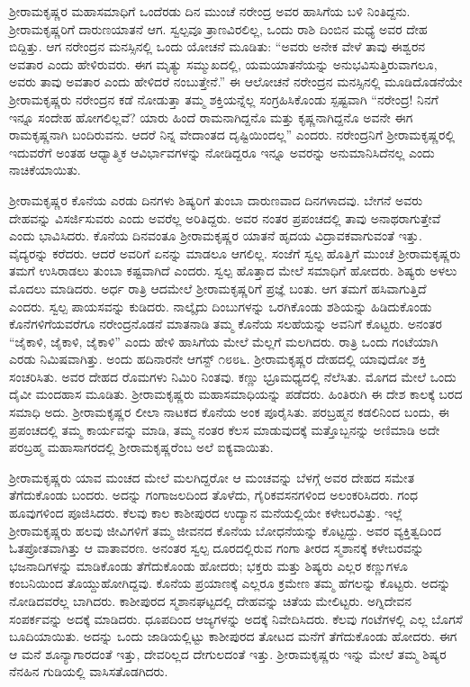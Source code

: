ಶ‍್ರೀರಾಮಕೃಷ್ಣರ ಮಹಾಸಮಾಧಿಗೆ ಒಂದೆರಡು ದಿನ ಮುಂಚೆ ನರೇಂದ್ರ ಅವರ ಹಾಸಿಗೆಯ ಬಳಿ ನಿಂತಿದ್ದನು. ಶ‍್ರೀರಾಮಕೃಷ್ಣರಿಗೆ ದಾರುಣಯಾತನೆ ಆಗ. ಸ್ವಲ್ಪವೂ ತ್ರಾಣವಿರಲಿಲ್ಲ, ಒಂದು ರಾಶಿ ದಿಂಬಿನ ಮಧ್ಯೆ ಅವರ ದೇಹ ಬಿದ್ದಿತ್ತು. ಆಗ ನರೇಂದ್ರನ ಮನಸ್ಸಿನಲ್ಲಿ ಒಂದು ಯೋಚನೆ ಮೂಡಿತು: “ಅವರು ಅನೇಕ ವೇಳೆ ತಾವು ಈಶ್ವರನ ಅವತಾರ ಎಂದು ಹೇಳಿರುವರು. ಈಗ ಮೃತ್ಯು ಸಮ್ಮುಖದಲ್ಲಿ, ಯಮಯಾತನೆಯನ್ನು ಅನುಭವಿಸುತ್ತಿರುವಾಗಲೂ, ಅವರು ತಾವು ಅವತಾರ ಎಂದು ಹೇಳಿದರೆ ನಂಬುತ್ತೇನೆ.” ಈ ಆಲೋಚನೆ ನರೇಂದ್ರನ ಮನಸ್ಸಿನಲ್ಲಿ ಮೂಡಿದೊಡನೆಯೇ ಶ‍್ರೀರಾಮಕೃಷ್ಣರು ನರೇಂದ್ರನ ಕಡೆ ನೋಡುತ್ತಾ ತಮ್ಮ ಶಕ್ತಿಯನ್ನೆಲ್ಲ ಸಂಗ್ರಹಿಸಿಕೊಂಡು ಸ್ಪಷ್ಟವಾಗಿ “ನರೇಂದ್ರ! ನಿನಗೆ ಇನ್ನೂ ಸಂದೇಹ ಹೋಗಲಿಲ್ಲವೆ? ಯಾರು ಹಿಂದೆ ರಾಮನಾಗಿದ್ದನೊ ಮತ್ತು ಕೃಷ್ಣನಾಗಿದ್ದನೊ ಅವನೇ ಈಗ ರಾಮಕೃಷ್ಣನಾಗಿ ಬಂದಿರುವನು. ಆದರೆ ನಿನ್ನ ವೇದಾಂತದ ದೃಷ್ಟಿಯಿಂದಲ್ಲ” ಎಂದರು. ನರೇಂದ್ರನಿಗೆ ಶ‍್ರೀರಾಮಕೃಷ್ಣರಲ್ಲಿ ಇದುವರೆಗೆ ಅಂತಹ ಆಧ್ಯಾತ್ಮಿಕ ಆವಿರ್ಭಾವಗಳನ್ನು ನೋಡಿದ್ದರೂ ಇನ್ನೂ ಅವರನ್ನು ಅನುಮಾನಿಸಿದೆನಲ್ಲ ಎಂದು ನಾಚಿಕೆಯಾಯಿತು.

ಶ‍್ರೀರಾಮಕೃಷ್ಣರ ಕೊನೆಯ ಎರಡು ದಿನಗಳು ಶಿಷ್ಯರಿಗೆ ತುಂಬಾ ದಾರುಣವಾದ ದಿನಗಳಾದವು. ಬೇಗನೆ ಅವರು ದೇಹವನ್ನು ವಿಸರ್ಜಿಸುವರು ಎಂದು ಅವರೆಲ್ಲ ಅರಿತಿದ್ದರು. ಅವರ ನಂತರ ಪ್ರಪಂಚದಲ್ಲಿ ತಾವು ಅನಾಥರಾಗುತ್ತೇವೆ ಎಂದು ಭಾವಿಸಿದರು. ಕೊನೆಯ ದಿನವಂತೂ ಶ‍್ರೀರಾಮಕೃಷ್ಣರ ಯಾತನೆ ಹೃದಯ ವಿದ್ರಾವಕವಾಗುವಂತೆ ಇತ್ತು. ವೈದ್ಯರನ್ನು ಕರೆದರು. ಆದರೆ ಅವರಿಗೆ ಏನನ್ನು ಮಾಡಲೂ ಆಗಲಿಲ್ಲ. ಸಂಜೆಗೆ ಸ್ವಲ್ಪ ಹೊತ್ತಿಗೆ ಮುಂಚೆ ಶ‍್ರೀರಾಮಕೃಷ್ಣರು ತಮಗೆ ಉಸಿರಾಡಲು ತುಂಬಾ ಕಷ್ಟವಾಗಿದೆ ಎಂದರು. ಸ್ವಲ್ಪ ಹೊತ್ತಾದ ಮೇಲೆ ಸಮಾಧಿಗೆ ಹೋದರು. ಶಿಷ್ಯರು ಅಳಲು ಮೊದಲು ಮಾಡಿದರು. ಅರ್ಧ ರಾತ್ರಿ ಆದಮೇಲೆ ಶ‍್ರೀರಾಮಕೃಷ್ಣರಿಗೆ ಪ್ರಜ್ಞೆ ಬಂತು. ಆಗ ತಮಗೆ ಹಸಿವಾಗುತ್ತಿದೆ ಎಂದರು. ಸ್ವಲ್ಪ ಪಾಯಸವನ್ನು ಕುಡಿದರು. ನಾಲ್ಕೈದು ದಿಂಬುಗಳನ್ನು ಒರಗಿಕೊಂಡು ಶಶಿಯನ್ನು ಹಿಡಿದುಕೊಂಡು ಕೊನೆಗಳಿಗೆಯವರೆಗೂ ನರೇಂದ್ರನೊಡನೆ ಮಾತನಾಡಿ ತಮ್ಮ ಕೊನೆಯ ಸಲಹೆಯನ್ನು ಅವನಿಗೆ ಕೊಟ್ಟರು. ಅನಂತರ “ಜೈಕಾಳಿ, ಜೈಕಾಳಿ, ಜೈಕಾಳಿ” ಎಂದು ಹೇಳಿ ಹಾಸಿಗೆಯ ಮೇಲೆ ಮೆಲ್ಲಗೆ ಮಲಗಿದರು. ರಾತ್ರಿ ಒಂದು ಗಂಟೆಯಾಗಿ ಎರಡು ನಿಮಿಷವಾಗಿತ್ತು. ಅಂದು ಹದಿನಾರನೇ ಆಗಸ್ಟ್ ೧೮೮೬. ಶ‍್ರೀರಾಮಕೃಷ್ಣರ ದೇಹದಲ್ಲಿ ಯಾವುದೋ ಶಕ್ತಿ ಸಂಚರಿಸಿತು. ಅವರ ದೇಹದ ರೊಮಗಳು ನಿಮಿರಿ ನಿಂತವು. ಕಣ್ಣು ಭ್ರೂಮಧ್ಯದಲ್ಲಿ ನೆಲೆಸಿತು. ಮೊಗದ ಮೇಲೆ ಒಂದು ದೈವೀ ಮಂದಹಾಸ ಮೂಡಿತು. ಶ‍್ರೀರಾಮಕೃಷ್ಣರು ಮಹಾಸಮಾಧಿಯನ್ನು ಪಡೆದರು. ಹಿಂತಿರುಗಿ ಈ ದೇಶ ಕಾಲಕ್ಕೆ ಬರದ ಸಮಾಧಿ ಅದು. ಶ‍್ರೀರಾಮಕೃಷ್ಣರ ಲೀಲಾ ನಾಟಕದ ಕೊನೆಯ ಅಂಕ ಪೂರೈಸಿತು. ಪರಬ್ರಹ್ಮನ ಕಡಲಿನಿಂದ ಬಂದು, ಈ ಪ್ರಪಂಚದಲ್ಲಿ ತಮ್ಮ ಕಾರ್ಯವನ್ನು ಮಾಡಿ, ತಮ್ಮ ನಂತರ ಕೆಲಸ ಮಾಡುವುದಕ್ಕೆ ಮತ್ತೊಬ್ಬನನ್ನು ಅಣಿಮಾಡಿ ಅದೇ ಪರಬ್ರಹ್ಮ ಮಹಾಸಾಗರದಲ್ಲಿ ಶ‍್ರೀರಾಮಕೃಷ್ಣರೆಂಬ ಅಲೆ ಐಕ್ಯವಾಯಿತು.

ಶ‍್ರೀರಾಮಕೃಷ್ಣರು ಯಾವ ಮಂಚದ ಮೇಲೆ ಮಲಗಿದ್ದರೋ ಆ ಮಂಚವನ್ನು ಬೆಳಗ್ಗೆ ಅವರ ದೇಹದ ಸಮೇತ ತೆಗೆದುಕೊಂಡು ಬಂದರು. ಅದನ್ನು ಗಂಗಾಜಲದಿಂದ ತೊಳೆದು, ಗೈರಿಕವಸನಗಳಿಂದ ಅಲಂಕರಿಸಿದರು. ಗಂಧ ಹೂವುಗಳಿಂದ ಪೂಜಿಸಿದರು. ಕೆಲವು ಕಾಲ ಕಾಶೀಪುರದ ಉದ್ಯಾನ ಮನೆಯಲ್ಲಿಯೇ ಕಳೇಬರವಿತ್ತು. ಇಲ್ಲೆ ಶ‍್ರೀರಾಮಕೃಷ್ಣರು ಹಲವು ಜೀವಿಗಳಿಗೆ ತಮ್ಮ ಜೀವನದ ಕೊನೆಯ ಬೋಧನೆಯನ್ನು ಕೊಟ್ಟದ್ದು. ಅವರ ವ್ಯಕ್ತಿತ್ವದಿಂದ ಓತಪ್ರೋತವಾಗಿತ್ತು ಆ ವಾತಾವರಣ. ಅನಂತರ ಸ್ವಲ್ಪ ದೂರದಲ್ಲಿರುವ ಗಂಗಾ ತೀರದ ಸ್ಮಶಾನಕ್ಕೆ ಕಳೇಬರವನ್ನು ಭಜನಾದಿಗಳನ್ನು ಮಾಡಿಕೊಂಡು ತೆಗೆದುಕೊಂಡು ಹೋದರು; ಭಕ್ತರು ಮತ್ತು ಶಿಷ್ಯರು ಎಲ್ಲರ ಕಣ್ಣುಗಳೂ ಕಂಬನಿಯಿಂದ ತೊಯ್ದುಹೋಗಿದ್ದವು. ಕೊನೆಯ ಪ್ರಯಾಣಕ್ಕೆ ಎಲ್ಲರೂ ಕ್ರಮೇಣ ತಮ್ಮ ಹೆಗಲನ್ನು ಕೊಟ್ಟರು. ಅದನ್ನು ನೋಡಿದವರೆಲ್ಲ ಬಾಗಿದರು. ಕಾಶೀಪುರದ ಸ್ಮಶಾನಘಟ್ಟದಲ್ಲಿ ದೇಹವನ್ನು ಚಿತೆಯ ಮೇಲಿಟ್ಟರು. ಅಗ್ನಿದೇವನ ಸಂಪರ್ಕವನ್ನು ಅದಕ್ಕೆ ಮಾಡಿದರು. ಧೂಪದಿಂದ ಆಜ್ಯಗಳನ್ನು ಅದಕ್ಕೆ ನಿವೇದಿಸಿದರು. ಕೆಲವು ಗಂಟೆಗಳಲ್ಲಿ ಎಲ್ಲ ಬೊಗಸೆ ಬೂದಿಯಾಯಿತು. ಅದನ್ನು ಒಂದು ಜಾಡಿಯಲ್ಲಿಟ್ಟು ಕಾಶೀಪುರದ ತೋಟದ ಮನೆಗೆ ತೆಗೆದುಕೊಂಡು ಹೋದರು. ಈಗ ಆ ಮನೆ ಶೂನ್ಯಾಗಾರದಂತೆ ಇತ್ತು, ದೇವರಿಲ್ಲದ ದೇಗುಲದಂತೆ ಇತ್ತು. ಶ‍್ರೀರಾಮಕೃಷ್ಣರು ಇನ್ನು ಮೇಲೆ ತಮ್ಮ ಶಿಷ್ಯರ ನೆನಹಿನ ಗುಡಿಯಲ್ಲಿ ವಾಸಿಸತೊಡಗಿದರು.

